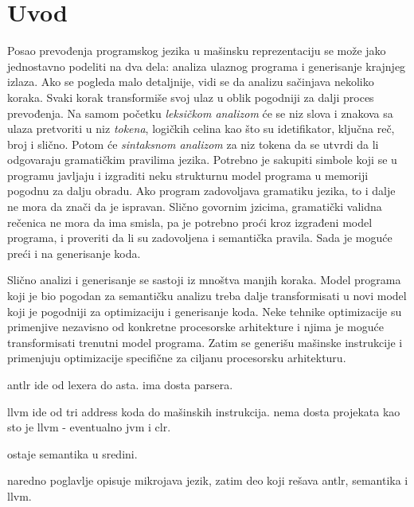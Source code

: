 \chapter{Uvod}

Posao prevođenja programskog jezika u mašinsku reprezentaciju se može jako jednostavno podeliti na dva dela: analiza ulaznog programa i generisanje krajnjeg izlaza\cite{dragon}. 
Ako se pogleda malo detaljnije, vidi se da analizu sačinjava nekoliko koraka. 
Svaki korak transformiše svoj ulaz u oblik pogodniji za dalji proces prevođenja. 
Na samom početku \emph{leksičkom analizom} će se niz slova i znakova sa ulaza pretvoriti u niz \emph{tokena}, logičkih celina kao što su idetifikator, ključna reč, broj i slično. 
Potom će \emph{sintaksnom analizom} za niz tokena da se utvrdi da li odgovaraju gramatičkim pravilima jezika. 
Potrebno je sakupiti simbole koji se u programu javljaju i izgraditi neku strukturnu model programa u memoriji pogodnu za dalju obradu. 
Ako program zadovoljava gramatiku jezika, to i dalje ne mora da znači da je ispravan. 
Slično govornim jzicima, gramatički validna rečenica ne mora da ima smisla, pa je potrebno proći kroz izgrađeni model programa, i proveriti da li su zadovoljena i semantička pravila. 
Sada je moguće preći i na generisanje koda.

Slično analizi i generisanje se sastoji iz mnoštva manjih koraka. 
Model programa koji je bio pogodan za semantičku analizu treba dalje transformisati u novi model koji je pogodniji za optimizaciju i generisanje koda. 
Neke tehnike optimizacije su primenjive nezavisno od konkretne procesorske arhitekture i njima je moguće transformisati trenutni model programa. 
Zatim se generišu mašinske instrukcije i primenjuju optimizacije specifične za ciljanu procesorsku arhitekturu.

antlr ide od lexera do asta.
ima dosta parsera.

llvm ide od tri address koda do mašinskih instrukcija.
nema dosta projekata kao sto je llvm - eventualno jvm i clr.

ostaje semantika u sredini.

naredno poglavlje opisuje mikrojava jezik, zatim deo koji rešava antlr, semantika i llvm.
